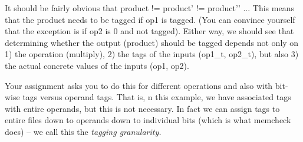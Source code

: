 It should be fairly obvious that product != product’ != product’’ ... This means that the product needs to
be tagged if op1 is tagged. (You can convince yourself that the exception is if op2 is 0 and not tagged).
Either way, we should see that determining whether the output (product) should be tagged depends not
only on 1) the operation (multiply), 2) the tags of the inputs (op1\_t, op2\_t), but also 3) the actual
concrete values of the inputs (op1, op2).

Your assignment asks you to do this for different operations and also with bit-wise tags versus operand
tags. That is, n this example, we have associated tags with entire operands, but this is not necessary. In
fact we can assign tags to entire files down to operands down to individual bits (which is what
memcheck does) -- we call this the {\em tagging granularity.}

